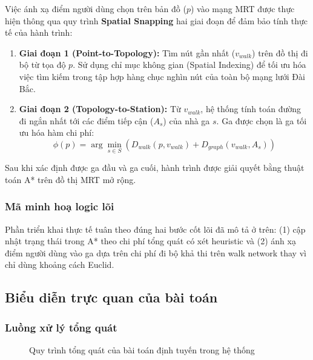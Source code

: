 \documentclass[../DoAn.tex]{subfiles}
\begin{document}
Việc ánh xạ điểm người dùng chọn trên bản đồ (\(p\)) vào mạng MRT được thực hiện thông qua quy trình \textbf{Spatial Snapping} hai giai đoạn để đảm bảo tính thực tế của hành trình:
\begin{enumerate}
    \item \textbf{Giai đoạn 1 (Point-to-Topology):} Tìm nút gần nhất (\(v_{walk}\)) trên đồ thị đi bộ từ tọa độ \(p\). Sử dụng chỉ mục không gian (Spatial Indexing) để tối ưu hóa việc tìm kiếm trong tập hợp hàng chục nghìn nút của toàn bộ mạng lưới Đài Bắc.
    \item \textbf{Giai đoạn 2 (Topology-to-Station):} Từ \(v_{walk}\), hệ thống tính toán đường đi ngắn nhất tới các điểm tiếp cận (\(A_s\)) của nhà ga \(s\). Ga được chọn là ga tối ưu hóa hàm chi phí:
    \[
    \phi(p) = \arg\min_{s \in S} \left( D_{walk}(p, v_{walk}) + D_{graph}(v_{walk}, A_s) \right)
    \]
\end{enumerate}

Sau khi xác định được ga đầu và ga cuối, hành trình được giải quyết bằng thuật toán A* trên đồ thị MRT mở rộng.


\subsubsection{Mã minh hoạ logic lõi}
Phần triển khai thực tế tuân theo đúng hai bước cốt lõi đã mô tả ở trên: (1) cập nhật trạng thái trong A* theo chi phí tổng quát có xét heuristic và (2) ánh xạ điểm người dùng vào ga dựa trên chi phí đi bộ khả thi trên walk network thay vì chỉ dùng khoảng cách Euclid.

\subsection{Biểu diễn trực quan của bài toán}

\subsubsection{Luồng xử lý tổng quát}
\begin{figure}[H]
\centering
{}
\caption{Quy trình tổng quát của bài toán định tuyến trong hệ thống}
\label{fig:problem_pipeline}
\end{figure}
\end{document}
